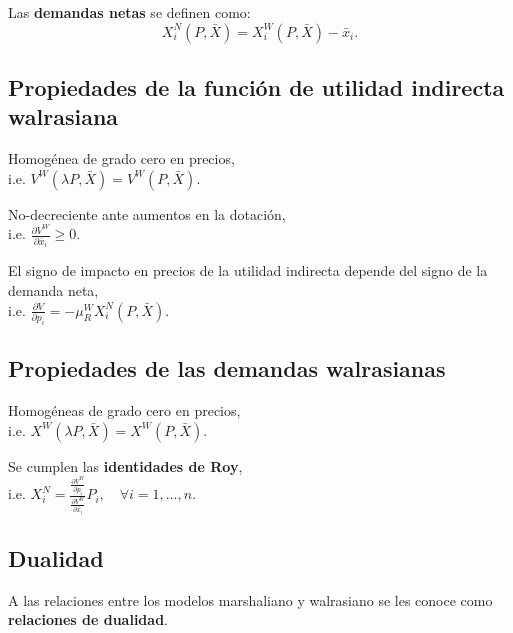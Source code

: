 \documentclass[8pt,a4paper]{extarticle}
\begin{document}
\begin{multicols}{3}
\begin{boxdef}
	Las \textbf{demandas netas} se definen como:
	\[
		X_i^N (P, \bar{X}) = X_i^W (P, \bar{X}) - \bar{x}_i
	.\] 
\end{boxdef}

\sectionbreak

\subsection{Propiedades de la función de utilidad indirecta walrasiana}

\begin{eqlist}
\item Homogénea de grado cero en precios, \\ i.e. $V^W (\lambda P, \bar{X}) = V^W (P, \bar{X})$.
\item No-decreciente ante aumentos en la dotación, \\ i.e. $\displaystyle \frac{\partial V^W}{\partial \bar{x}_i} \geq 0$.
\item El signo de impacto en precios de la utilidad indirecta depende del signo de la demanda neta, \\ i.e. $\displaystyle \frac{\partial V}{\partial p_i} = - \mu_R^W X_i^N (P, \bar{X})$.
\end{eqlist}

\subsection{Propiedades de las demandas walrasianas}

\begin{eqlist}
\item Homogéneas de grado cero en precios, \\ i.e. $X^W (\lambda P, \bar{X}) = X^W (P, \bar{X})$.
\item Se cumplen las \textbf{identidades de Roy}, \\ i.e. $\displaystyle X^N_i = \frac{\displaystyle \frac{\partial V^W}{\partial p_{i}}}{ \displaystyle \frac{\partial V^W}{\partial \bar{x}_i}} P_i, \quad \forall i = 1, \ldots, n$.
\end{eqlist}

\subsection{Dualidad}

A las relaciones entre los modelos marshaliano y walrasiano se les conoce como \textbf{relaciones de dualidad}.


\end{multicols}
\end{document}
